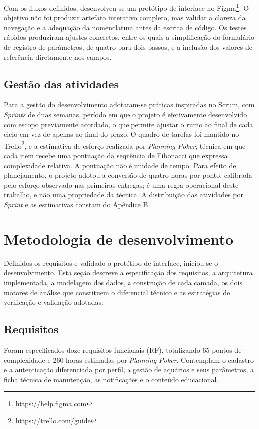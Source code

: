 \documentclass[12pt,oneside,a4paper,brazilian]{abntex2}
\begin{document}
Com os fluxos definidos, desenvolveu-se um protótipo de interface no Figma\footnote{\url{https://help.figma.com}}. O objetivo não foi produzir artefato interativo completo, mas validar a clareza da navegação e a adequação da nomenclatura antes da escrita de código. Os testes rápidos produziram ajustes concretos, entre os quais a simplificação do formulário de registro de parâmetros, de quatro para dois passos, e a inclusão dos valores de referência diretamente nos campos.


\subsection{Gestão das atividades}
Para a gestão do desenvolvimento adotaram-se práticas inspiradas no Scrum, com \textit{Sprints} de duas semanas, período em que o projeto é efetivamente desenvolvido com escopo previamente acordado, o que permite ajustar o rumo ao final de cada ciclo em vez de apenas ao final do prazo. O quadro de tarefas foi mantido no Trello\footnote{\url{https://trello.com/guide}}, e a estimativa de esforço realizada por \textit{Planning Poker}, técnica em que cada item recebe uma pontuação da sequência de Fibonacci que expressa complexidade relativa. A pontuação não é unidade de tempo. Para efeito de planejamento, o projeto adotou a conversão de quatro horas por ponto, calibrada pelo esforço observado nas primeiras entregas; é uma regra operacional deste trabalho, e não uma propriedade da técnica. A distribuição das atividades por \textit{Sprint} e as estimativas constam do Apêndice B.


\section{Metodologia de desenvolvimento}
Definidos os requisitos e validado o protótipo de interface, iniciou-se o desenvolvimento. Esta seção descreve a especificação dos requisitos, a arquitetura implementada, a modelagem dos dados, a construção de cada camada, os dois motores de análise que constituem o diferencial técnico e as estratégias de verificação e validação adotadas.


\subsection{Requisitos}
Foram especificados doze requisitos funcionais (RF), totalizando 65 pontos de complexidade e 260 horas estimadas por \textit{Planning Poker}. Contemplam o cadastro e a autenticação diferenciada por perfil, a gestão de aquários e seus parâmetros, a ficha técnica de manutenção, as notificações e o conteúdo educacional.
\end{document}
